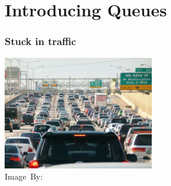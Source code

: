 \section{Introducing Queues}
\label{sec:introducing_queues}


\begin{frame}
	\frametitle{Stuck in traffic}

	\begin{center}
		\includegraphics[width=0.5\textwidth]{figures/traffic.jpg}\\
		\hspace*{15pt}\hbox{\scriptsize Image By:}
	\end{center}
\end{frame}

